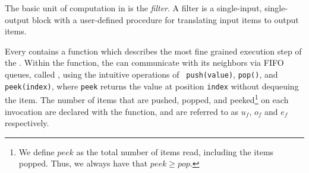 The basic unit of computation in \StreamIt is the {\it filter}.  A
filter is a single-input, single-output block with a user-defined
procedure for translating input items to output items.
\begin{comment}
An example of a filter is the {\tt FIRFilter}, a component of our
software radio (see Figure \ref{fig:radiocode}). Each filter
contains an {\tt init} function that is called at initialization
time; in this case, the {\tt FIRFilter} calculates {\tt weights},
which represents its impulse response.
\end{comment}
Every \filter contains a \work function which describes the most
fine grained execution step of the \filter. Within the \work
function, the \filter can communicate with its neighbors via FIFO
queues, called \Channels, using the intuitive operations of {\tt
push(value)}, {\tt pop()}, and {\tt peek(index)}, where {\tt peek}
returns the value at position {\tt index} without dequeuing the
item.  The number of items that are pushed, popped, and
peeked\footnote{We define $peek$ as the total number of items
read, including the items popped.  Thus, we always have that $peek
\ge pop$.} on each invocation are declared with the \work
function, and are referred to as $u_f$, $o_f$ and $e_f$
respectively.

\begin{comment}
In addition to {\tt work}, a filter can contain a {\tt prework}
function that is executed exactly once between initialization and
the steady-state.  Like {\tt work}, {\tt prework} can access the
input and output tapes of the filter; however, the I/O rates of
{\tt work} and {\tt prework} can differ. In an {\tt FIRFilter}, a
{\tt prework} function is essential for correctly filtering the
beginning of the input stream.  The user never calls the {\tt
init}, {\tt prework}, and {\tt work} functions--they are all
called automatically.
\end{comment}




